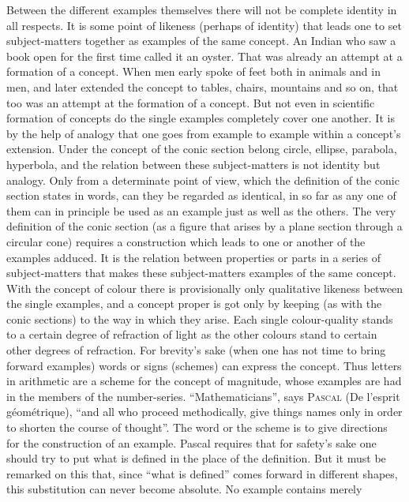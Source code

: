 \documentclass[12pt]{book}
\newcommand{\opage}[1]{\marginnote{\footnotesize\textit{[#1]}}}
\begin{document}
Between the different examples themselves there will not be complete identity in
all respects. It is some point of likeness (perhaps of identity) that leads one
to set subject-matters together as examples of the same concept. An Indian who
saw a book open for the first time called it an oyster. That was already an
attempt at a formation of a concept. When men early spoke of feet both in
animals and in men, and later extended the concept to tables, chairs, mountains
and so on, that too was an attempt at the formation of a concept. But not even
in scientific formation of concepts do the single examples completely cover one
another. It is by the help of analogy that one goes from example to example
within a concept's extension. Under the concept of the conic section belong
circle, ellipse, parabola, hyperbola, and the relation between these
subject-matters is not identity but analogy. Only from a determinate point of
view, which the definition of the conic section states in words, can they be
regarded as identical, in so far as any one of them can in principle be used as
an example just as well as the others. The very definition of the conic section
(as a figure that arises by a plane section through a circular cone) requires a
construction which leads to one or another of the examples adduced. It is the
relation between properties or parts in a series of subject-matters that makes
these subject-matters examples of the same concept. With the concept of colour
there is provisionally only qualitative likeness between the single examples, and
a concept proper is got only by keeping (as with the conic sections) to the way
in which they arise. Each single colour-quality stands to a certain degree of
refraction of light as the other colours stand to certain other degrees of
\opage{50}refraction. For brevity's sake (when one has not time to bring forward examples)
words or signs (schemes) can express the concept. Thus letters in arithmetic are
a scheme for the concept of magnitude, whose examples are had in the members of
the number-series. ``Mathematicians'', says \textsc{Pascal} (De l'esprit
géométrique), ``and all who proceed methodically, give things names only in order
to shorten the course of thought''. The word or the scheme is to give directions
for the construction of an example. Pascal requires that for safety's sake one
should try to put what is defined in the place of the definition. But it must be
remarked on this that, since ``what is defined'' comes forward in different
shapes, this substitution can never become absolute. No example contains merely
\end{document}
